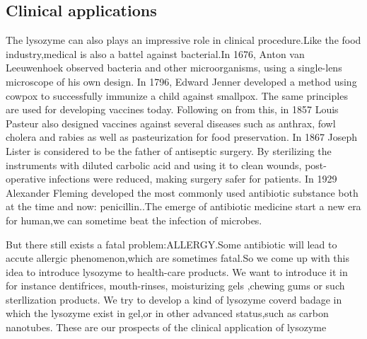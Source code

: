 \documentclass[a4paper,10pt]{article}
\begin{document}
    \subsection{Clinical applications}
    The lysozyme can also plays an impressive role in clinical procedure.Like the food industry,medical is also
    a battel against bacterial.In 1676, Anton van Leeuwenhoek observed bacteria and other microorganisms, using a single-lens microscope of his own design.
    In 1796, Edward Jenner developed a method using cowpox to successfully immunize a child against smallpox. The same principles are used for developing vaccines today.
    Following on from this, in 1857 Louis Pasteur also designed vaccines against several diseases such as anthrax, fowl cholera and rabies as well as pasteurization for food preservation.
    In 1867 Joseph Lister is considered to be the father of antiseptic surgery. By sterilizing the instruments with diluted carbolic acid and using it to clean wounds, post-operative infections were reduced, making surgery safer for patients.
    In 1929 Alexander Fleming developed the most commonly used antibiotic substance both at the time and now: penicillin.\citep{Brock2003}.The emerge of antibiotic medicine start a new era for human,we can sometime beat the infection of microbes.

    But there still exists a fatal problem:ALLERGY.Some antibiotic will lead to accute allergic phenomenon,which are sometimes fatal.So we come up with this idea to 
    introduce lysozyme to health-care products. We want to introduce it in for instance dentifrices, mouth-rinses, moisturizing gels ,chewing gums or such sterllization products.\citep{Tenovuo2002}
    We try to develop a kind of lysozyme coverd badage in which the lysozyme exist in gel,or in other advanced status,such as carbon nanotubes.
    These are our prospects of the clinical application of lysozyme
    \printbibliography[title={Bibliography}] 
\end{document}
